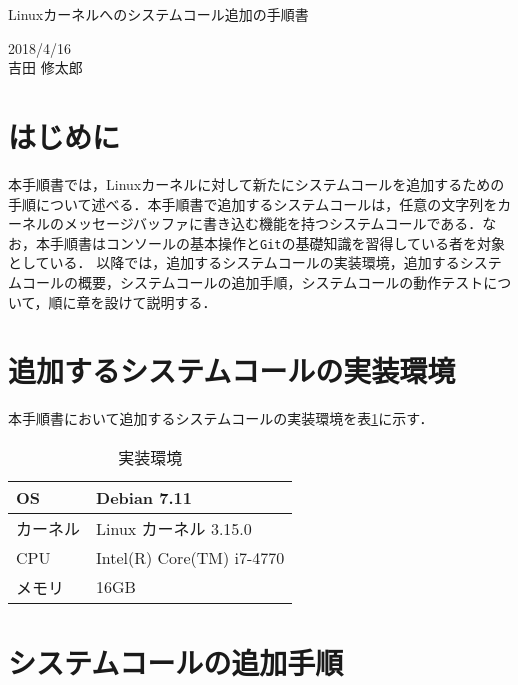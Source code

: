 \documentclass[12pt]{jsarticle}
\begin{document}
\begin{center}
  {\LARGE Linuxカーネルへのシステムコール追加の手順書}
\end{center}

\begin{flushright}
  2018/4/16\\
  吉田 修太郎
\end{flushright}
\section{はじめに}
本手順書では，Linuxカーネルに対して新たにシステムコールを追加するための手順について述べる．本手順書で追加するシステムコールは，任意の文字列をカーネルのメッセージバッファに書き込む機能を持つシステムコールである．なお，本手順書はコンソールの基本操作と\verb|Git|の基礎知識を習得している者を対象としている．
以降では，追加するシステムコールの実装環境，追加するシステムコールの概要，システムコールの追加手順，システムコールの動作テストについて，順に章を設けて説明する．

\section{追加するシステムコールの実装環境}\label{sec2}
本手順書において追加するシステムコールの実装環境を表\ref{table1}に示す．
\begin{table}[h!]
  \begin{center}
    \caption{実装環境}%
    \begin{tabular}{l|l}
      \hline\hline
      OS & Debian 7.11 \\
      \hline
      カーネル & Linux カーネル 3.15.0 \\
      \hline
      CPU & Intel(R) Core(TM) i7-4770 \\
      \hline
      メモリ & 16GB\\
      \hline
    \end{tabular}
    \label{table1}
  \end{center}
\end{table}

\section{システムコールの追加手順}
\end{document}
